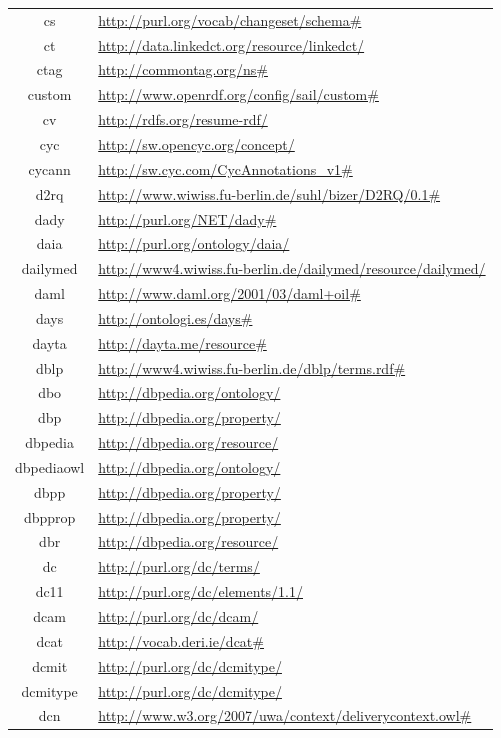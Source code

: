 \documentclass{article}
\begin{document}
\begin{longtable}{ c | p{8cm} }
		cs & \url{http://purl.org/vocab/changeset/schema#} \\
		ct & \url{http://data.linkedct.org/resource/linkedct/} \\
		ctag & \url{http://commontag.org/ns#} \\
		custom & \url{http://www.openrdf.org/config/sail/custom#} \\
		cv & \url{http://rdfs.org/resume-rdf/} \\
		cyc & \url{http://sw.opencyc.org/concept/} \\
		cycann & \url{http://sw.cyc.com/CycAnnotations_v1#} \\
		d2rq & \url{http://www.wiwiss.fu-berlin.de/suhl/bizer/D2RQ/0.1#} \\
		dady & \url{http://purl.org/NET/dady#} \\
		daia & \url{http://purl.org/ontology/daia/} \\
		dailymed & \url{http://www4.wiwiss.fu-berlin.de/dailymed/resource/dailymed/} \\
		daml & \url{http://www.daml.org/2001/03/daml+oil#} \\
		days & \url{http://ontologi.es/days#} \\
		dayta & \url{http://dayta.me/resource#} \\
		dblp & \url{http://www4.wiwiss.fu-berlin.de/dblp/terms.rdf#} \\
		dbo & \url{http://dbpedia.org/ontology/} \\
		dbp & \url{http://dbpedia.org/property/} \\
		dbpedia & \url{http://dbpedia.org/resource/} \\
		dbpediaowl & \url{http://dbpedia.org/ontology/} \\
		dbpp & \url{http://dbpedia.org/property/} \\
		dbpprop & \url{http://dbpedia.org/property/} \\
		dbr & \url{http://dbpedia.org/resource/} \\
		dc & \url{http://purl.org/dc/terms/} \\
		dc11 & \url{http://purl.org/dc/elements/1.1/} \\
		dcam & \url{http://purl.org/dc/dcam/} \\
		dcat & \url{http://vocab.deri.ie/dcat#} \\
		dcmit & \url{http://purl.org/dc/dcmitype/} \\
		dcmitype & \url{http://purl.org/dc/dcmitype/} \\
		dcn & \url{http://www.w3.org/2007/uwa/context/deliverycontext.owl#} \\

\end{longtable}
\end{document}
